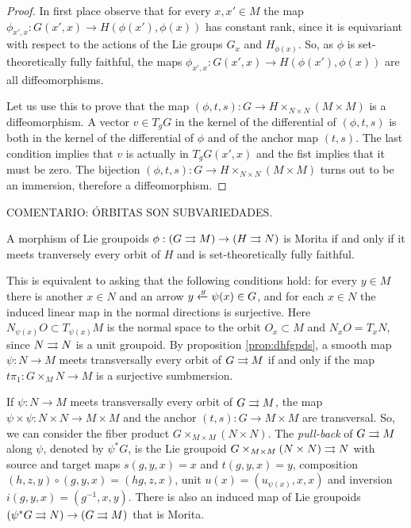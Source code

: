 \begin{proof}
In first place observe that for every $x,x'\in M$ the map $\phi_{x',x}: G(x',x)\to H(\phi(x'),\phi(x))$ has constant rank, since it is equivariant with respect to the actions of the Lie groups $G_x$ and $H_{\phi(x)}$.
So, as $\phi$ is set-theoretically fully faithful, the maps $\phi_{x',x}: G(x',x)\to H(\phi(x'),\phi(x))$ are all diffeomorphisms.

Let us use this to prove that the map $(\phi,t,s): G\to H\times_{N\times N} (M\times M)$ is a diffeomorphism.
A vector $v\in T_gG$ in the kernel of the differential of $(\phi,t,s)$ is both in the kernel of the differential of $\phi$ and of the anchor map $(t,s)$.
The last condition implies that $v$ is actually in $T_gG(x',x)$ and the fist implies that it must be zero.
The bijection $(\phi,t,s): G\to H\times_{N\times N} (M\times M)$ turns out to be an immersion, therefore a diffeomorphism.
\end{proof}

\noindent COMENTARIO: ÓRBITAS SON SUBVARIEDADES.

\begin{coro}
A morphism of Lie groupoids $\phi: (G\rightrightarrows M) \to (H\rightrightarrows N)$ is Morita if and only if it meets tranversely every orbit of $H$ and is set-theoretically fully faithful.
\end{coro}

This  is equivalent to asking that the following conditions hold: for every $y\in M$ there is another $x\in N$ and an arrow $\smash{y\xleftarrow{g}\psi(x)}\in G$, and for each $x\in N$ the induced linear map in the normal directions  is surjective.
Here $N_{\psi(x)}O \subset T_{\psi(x)}M$ is the normal space to the orbit $O_x\subset M$ and $N_xO=T_xN$, since $N\rightrightarrows N$ is a unit groupoid.
By proposition \ref{prop:dhfgpds}, a smooth map $\psi\colon N\to M$ meets transversally every orbit of $G\rightrightarrows M$ if and only if the map $t\pi_1\colon G\times_M N\to M$ is a surjective sumbmersion.

If $\psi\colon N\to M$ meets transversally every orbit of $G\rightrightarrows M$, the map $\psi\times\psi\colon N\times N\to M\times M$ and the anchor $(t,s)\colon G\to M\times M$ are transversal.
So, we can consider the fiber product $G\times_{M\times M} (N\times N)$.
The \emph{pull-back} of $G\rightrightarrows M$ along $\psi$, denoted by $\psi^*G$, is the Lie groupoid
\( G\times_{M\times M} (N\times N) \rightrightarrows N \)
with source and target maps $s(g,y,x) = x$ and $t(g,y,x) = y$, composition $(h,z,y)\circ(g,y,x) = (hg,z,x)$, unit $u(x) = (u_{\psi(x)},x,x)$ and inversion $i(g,y,x) = (g^{-1},x,y)$.
There is also an induced map of Lie groupoids
\( (\psi^*G\rightrightarrows N) \to (G\rightrightarrows M) \)
that is Morita.

